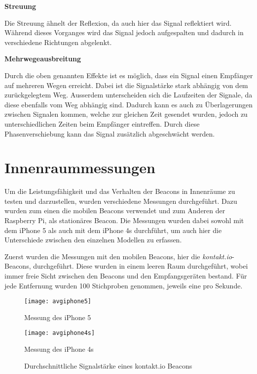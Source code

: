 \textbf{Streuung}

Die Streuung ähnelt der Reflexion, da auch hier das Signal reflektiert wird. Während dieses Vorganges wird das Signal jedoch aufgespalten und dadurch in verschiedene Richtungen abgelenkt.

\textbf{Mehrwegeausbreitung}

Durch die oben genannten Effekte ist es möglich, dass ein Signal einen Empfänger auf mehreren Wegen erreicht. Dabei ist die Signalstärke stark abhängig von dem zurückgelegtem Weg. Ausserdem unterscheiden sich die Laufzeiten der Signale, da diese ebenfalls vom Weg abhängig sind. Dadurch kann es auch zu Überlagerungen zwischen Signalen kommen, welche zur gleichen Zeit gesendet wurden, jedoch zu unterschiedlichen Zeiten beim Empfänger eintreffen. 
Durch diese Phasenverschiebung kann das Signal zusätzlich abgeschwächt werden.


\section{Innenraummessungen}
\label{sec:dataandmeasurement:indoormeasure}
Um die Leistungsfähigkeit und das Verhalten der Beacons in Innenräume zu testen und darzustellen, wurden verschiedene Messungen durchgeführt. Dazu wurden zum einen die mobilen Beacons verwendet und zum Anderen der Raspberry Pi, als stationäres Beacon.
Die Messungen wurden dabei sowohl mit dem iPhone 5 als auch mit dem iPhone 4s durchführt, um auch hier die Unterschiede zwischen den einzelnen Modellen zu erfassen.


Zuerst wurden die Messungen mit den mobilen Beacons, hier die \emph{kontakt.io}-Beacons, durchgeführt.
Diese wurden in einem leeren Raum durchgeführt, wobei immer freie Sicht zwischen den Beacons und den Empfangsgeräten bestand. Für jede Entfernung wurden 100 Stichproben genommen, jeweils eine pro Sekunde.
\begin{figure}[h!]
	\centering
	\begin{minipage}[t]{8cm}
		\texttt{[image: avgiphone5]}
		\caption{Messung des iPhone 5}
		\label{avgiphone5-signalstrength}
	\end{minipage}
	\hspace{2cm}
	\begin{minipage}[t]{8cm}
			\texttt{[image: avgiphone4s]}
			\caption{Messung des iPhone 4s}
			\label{avgiphone4s-signalstrength}
	\end{minipage}
		\caption{Durchschnittliche Signalstärke eines kontakt.io Beacons}
		\label{signalstrength}
\end{figure}

